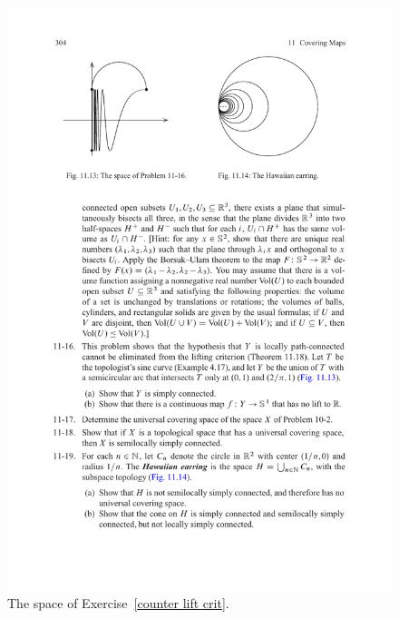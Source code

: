 \begin{figure}[htbp]
\centering
\begin{minipage}{200pt}
\centering
\includegraphics{pictures/sine-curve}
\caption{The space of Exercise~\ref{counter lift crit}.}
\end{minipage}
\hspace{20pt}
\begin{minipage}{200pt}
\centering

\end{minipage}
\end{figure}
